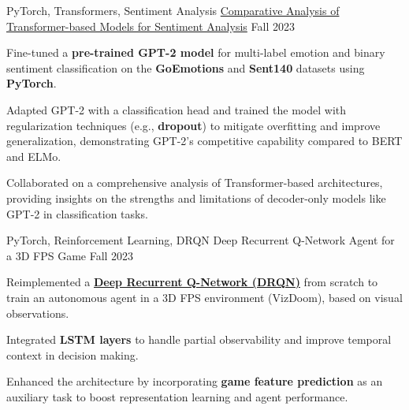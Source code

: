 \begin{cventries}
\cventry
    {PyTorch, Transformers, Sentiment Analysis} %
    {\href{https://github.com/aghassel/NLP-Sentiment-Analysis/}{Comparative Analysis of Transformer-based Models for Sentiment Analysis}} %
    {} %
    {Fall 2023} %
    {
      \begin{cvitems}
        \item {Fine-tuned a \textbf{pre-trained GPT-2 model} for multi-label emotion and binary sentiment classification on the \textbf{GoEmotions} and \textbf{Sent140} datasets using \textbf{PyTorch}.}
        \item {Adapted GPT-2 with a classification head and trained the model with regularization techniques (e.g., \textbf{dropout}) to mitigate overfitting and improve generalization, demonstrating GPT-2's competitive capability compared to BERT and ELMo.}
        \item {Collaborated on a comprehensive analysis of Transformer-based architectures, providing insights on the strengths and limitations of decoder-only models like GPT-2 in classification tasks.}
      \end{cvitems}
    }

\cventry
    {PyTorch, Reinforcement Learning, DRQN} %
    {Deep Recurrent Q-Network Agent for a 3D FPS Game} %
    {} %
    {Fall 2023} %
    {
      \begin{cvitems}
        \item {Reimplemented a \textbf{\href{https://arxiv.org/pdf/1609.05521}{Deep Recurrent Q-Network (DRQN)}} from scratch to train an autonomous agent in a 3D FPS environment (VizDoom), based on visual observations.}
        \item {Integrated \textbf{LSTM layers} to handle partial observability and improve temporal context in decision making.}
        \item {Enhanced the architecture by incorporating \textbf{game feature prediction} as an auxiliary task to boost representation learning and agent performance.}
      \end{cvitems}
    }


\end{cventries}
